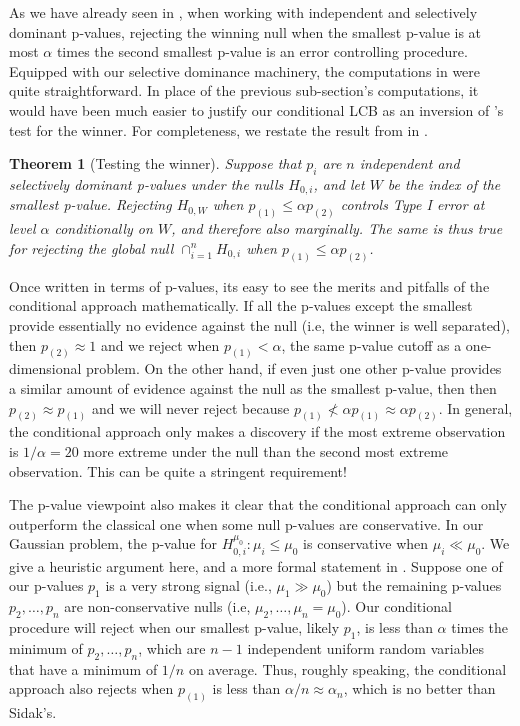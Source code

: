 \documentclass{article}
\newtheorem{theorem}{Theorem}
\begin{document}
As we have already seen in , when working with independent and selectively dominant p-values, rejecting the winning null when the smallest p-value is at most $\alpha$ times the second smallest p-value is an error controlling procedure. Equipped with our selective dominance machinery, the computations in  were quite straightforward. In place of the previous sub-section's computations, it would have been much easier to justify our conditional LCB as an inversion of 's test for the winner. For completeness, we restate the result from  in . 

\begin{theorem}[Testing the winner]
    \label{thm:cond}
    Suppose that $p_i$ are $n$ independent and selectively dominant p-values under the nulls $H_{0, i}$, and let $W$ be the index of the smallest p-value. Rejecting $H_{0, W}$ when $p_{(1)} \leq \alpha p_{(2)}$ controls Type I error at level $\alpha$ conditionally on $W$, and therefore also marginally. The same is thus true for rejecting the global null $\cap_{i=1}^n H_{0, i}$ when $p_{(1)} \leq \alpha p_{(2)}$. 
\end{theorem}

Once written in terms of p-values, its easy to see the merits and pitfalls of the conditional approach mathematically. If all the p-values except the smallest provide essentially no evidence against the null (i.e, the winner is well separated), then $p_{(2)} \approx 1$ and we reject when $p_{(1)} < \alpha$, the same p-value cutoff as a one-dimensional problem. On the other hand, if even just one other p-value provides a similar amount of evidence against the null as the smallest p-value, then then $p_{(2)} \approx p_{(1)}$ and we will never reject because $p_{(1)} \not < \alpha p_{(1)} \approx \alpha p_{(2)}$. In general, the conditional approach only makes a discovery if the most extreme observation is $1/\alpha = 20$ more extreme under the null than the second most extreme observation. This can be quite a stringent requirement!  

The p-value viewpoint also makes it clear that the conditional approach can only outperform the classical one when some null p-values are conservative. In our Gaussian problem, the p-value for $H^{\mu_0}_{0, i}: \mu_i \leq \mu_0$ is conservative when $\mu_i \ll \mu_0$. We give a heuristic argument here, and a more formal statement in . Suppose one of our p-values $p_1$ is a very strong signal (i.e., $\mu_1 \gg \mu_0$) but the remaining p-values $p_2, \dots, p_n$ are non-conservative nulls (i.e, $\mu_2, \dots, \mu_n = \mu_0$). Our conditional procedure will reject when our smallest p-value, likely $p_1$, is less than $\alpha$ times the minimum of $p_2, \dots, p_n$, which are $n-1$ independent uniform random variables that have a minimum of $1/n$ on average. Thus, roughly speaking, the conditional approach also rejects when $p_{(1)}$ is less than $\alpha/n \approx \alpha_n$, which is no better than Sidak's. 
\end{document}
